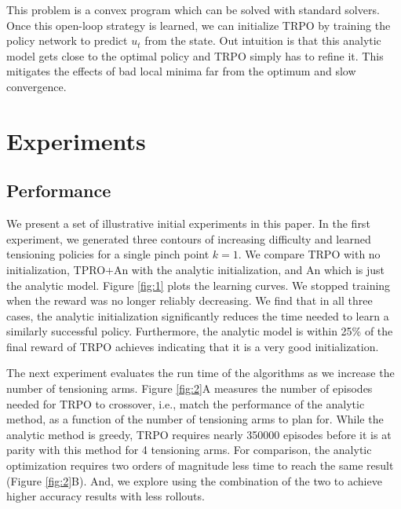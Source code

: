 This problem is a convex program which can be solved with standard solvers.
Once this open-loop strategy is learned, we can initialize TRPO by training the policy network to predict $u_{t}$ from the state.
Out intuition is that this analytic model gets close to the optimal policy and TRPO simply has to refine it.
This mitigates the effects of bad local minima far from the optimum and slow convergence.

\section{Experiments}

\subsection*{Performance}
We present a set of illustrative initial experiments in this paper.
In the first experiment, we generated three contours of increasing difficulty and learned tensioning policies for a single pinch point $k=1$.
We compare TRPO with no initialization, TPRO+An with the analytic initialization, and An which is just the analytic model.
Figure \ref{fig:1} plots the learning curves.
We stopped training when the reward was no longer reliably decreasing.
We find that in all three cases, the analytic initialization significantly reduces the time needed to learn a similarly successful policy.
Furthermore, the analytic model is within 25\% of the final reward of TRPO achieves indicating that it is a very good initialization.

The next experiment evaluates the run time of the algorithms as we increase the number of tensioning arms.
Figure \ref{fig:2}A measures the number of episodes needed for TRPO to crossover, i.e., match the performance of the analytic method, as a function of the number of tensioning arms to plan for.
While the analytic method is greedy, TRPO requires nearly 350000 episodes before it is at parity with this method for 4 tensioning arms.
For comparison, the analytic optimization requires two orders of magnitude less time to reach the same result (Figure \ref{fig:2}B).
And, we explore using the combination of the two to achieve higher accuracy results with less rollouts.

